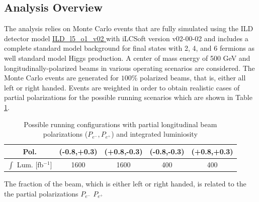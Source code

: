 \subsection{Analysis Overview}
\label{subsec:ana_overview}
The analysis relies on Monte Carlo events that are fully simulated using the ILD detector model \url{ ILD_l5_o1_v02 } with iLCSoft version v02-00-02 and includes a complete standard model background for final states with 2, 4, and 6 fermions as well standard model Higgs production.  A center of mass energy of 500 GeV and longitudinally-polarized beams in various operating scenarios are considered. The Monte Carlo events are generated for $100\%$ polarized beams, that is, either all left or right handed. Events are weighted in order to obtain realistic cases of partial polarizations for the possible running scenarios which are shown in Table \ref{tab:beamscenario}.

\begin{table}

\caption{Possible running configurations with partial longitudinal beam polarizations ($P_{e^-},P_{e^+}$) and integrated luminiosity \cite{ilcop} }
\label{tab:beamscenario}
\begin{tabular}{|c|c|c|c|c|}
\hline 
Pol. &(-0.8,+0.3) & (+0.8,-0.3) & (-0.8,-0.3) & (+0.8,+0.3) \\ 
\hline 
$\int$ Lum. [fb$^{-1}$] & 1600 & 1600 & 400 & 400 \\ 
\hline 
\end{tabular} 

\end{table}
 The fraction of the beam, which is either left or right handed, is related to the the partial polarizations $P_{e^-} \, \, P_{e^+}$ 
 
